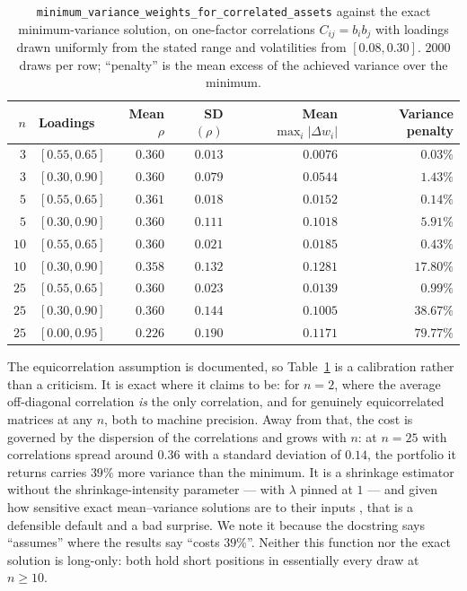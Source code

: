 \documentclass[11pt,a4paper]{article}
\newcommand{\code}[1]{\texttt{#1}}
\begin{document}
\begin{table}[t]
\centering
\caption{\code{minimum\_variance\_weights\_for\_correlated\_assets} against
the exact minimum-variance solution, on one-factor correlations
$C_{ij} = b_i b_j$ with loadings drawn uniformly from the stated range and
volatilities from $[0.08, 0.30]$. $2000$ draws per row; ``penalty'' is the
mean excess of the achieved variance over the minimum.}
\label{tab:mv}
\begin{tabular}{rlrrrr}
\toprule
$n$ & Loadings & Mean $\rho$ & SD$(\rho)$ & Mean $\max_i |\Delta w_i|$ & Variance penalty \\
\midrule
$3$  & $[0.55, 0.65]$ & $0.360$ & $0.013$ & $0.0076$ & $0.03\%$ \\
$3$  & $[0.30, 0.90]$ & $0.360$ & $0.079$ & $0.0544$ & $1.43\%$ \\
$5$  & $[0.55, 0.65]$ & $0.361$ & $0.018$ & $0.0152$ & $0.14\%$ \\
$5$  & $[0.30, 0.90]$ & $0.360$ & $0.111$ & $0.1018$ & $5.91\%$ \\
$10$ & $[0.55, 0.65]$ & $0.360$ & $0.021$ & $0.0185$ & $0.43\%$ \\
$10$ & $[0.30, 0.90]$ & $0.358$ & $0.132$ & $0.1281$ & $17.80\%$ \\
$25$ & $[0.55, 0.65]$ & $0.360$ & $0.023$ & $0.0139$ & $0.99\%$ \\
$25$ & $[0.30, 0.90]$ & $0.360$ & $0.144$ & $0.1005$ & $38.67\%$ \\
$25$ & $[0.00, 0.95]$ & $0.226$ & $0.190$ & $0.1171$ & $79.77\%$ \\
\bottomrule
\end{tabular}
\end{table}

The equicorrelation assumption is documented, so Table~\ref{tab:mv} is a
calibration rather than a criticism. It is exact where it claims to be: for
$n = 2$, where the average off-diagonal correlation \emph{is} the only
correlation, and for genuinely equicorrelated matrices at any $n$, both to
machine precision. Away from that, the cost is governed by the dispersion of
the correlations and grows with $n$: at $n = 25$ with correlations spread
around $0.36$ with a standard deviation of $0.14$, the portfolio it returns
carries $39\%$ more variance than the minimum. It is a shrinkage estimator
without the shrinkage-intensity parameter --- \citet{ledoit2004} with
$\lambda$ pinned at $1$ --- and given how sensitive exact mean--variance
solutions are to their inputs \citep{best1991,markowitz1952}, that is a
defensible default and a bad surprise. We note it because the docstring says
``assumes'' where the results say ``costs $39\%$''. Neither this function nor
the exact solution is long-only: both hold short positions in essentially
every draw at $n \geq 10$.
\end{document}
